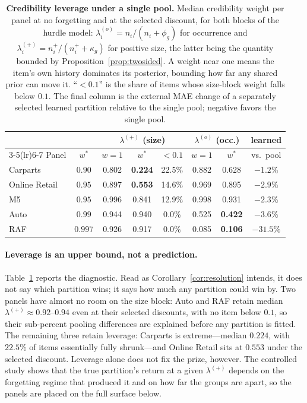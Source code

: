 \begin{table}[t]
\centering
\caption{\textbf{Credibility leverage under a single pool.} Median
credibility weight per panel at no forgetting and at the selected
discount, for both blocks of the hurdle model:
$\lambda^{(o)}_i=n_i/(n_i+\phi_g)$ for occurrence and
$\lambda^{(+)}_i=n_i^{+}/(n_i^{+}+\kappa_g)$ for positive size, the
latter being the quantity bounded by Proposition~\ref{prop:twosided}.
A weight near one means the item's own history dominates its posterior,
bounding how far any shared prior can move it. ``$<0.1$'' is the share of
items whose size-block weight falls below $0.1$. The final column is the
external MAE change of a separately selected learned partition relative to
the single pool; negative favors the single pool.}
\label{tab:leverage}
\small
\setlength{\tabcolsep}{3.0pt}
\begin{tabular}{lccccccc}
\toprule
 & & \multicolumn{3}{c}{$\lambda^{(+)}$ (size)} & \multicolumn{2}{c}{$\lambda^{(o)}$ (occ.)} & learned\\
\cmidrule(lr){3-5}\cmidrule(lr){6-7}
Panel & $w^{*}$ & $w{=}1$ & $w^{*}$ & $<0.1$ & $w{=}1$ & $w^{*}$ & vs.\ pool\\
\midrule
Carparts & $0.90$ & 0.802 & \textbf{0.224} & 22.5\% & 0.882 & 0.628 & $-1.2\%$\\
Online Retail & $0.95$ & 0.897 & \textbf{0.553} & 14.6\% & 0.969 & 0.895 & $-2.9\%$\\
M5 & $0.95$ & 0.996 & 0.841 & 12.9\% & 0.998 & 0.931 & $-2.3\%$\\
Auto & $0.99$ & 0.944 & 0.940 & 0.0\% & 0.525 & \textbf{0.422} & $-3.6\%$\\
RAF & $0.997$ & 0.926 & 0.917 & 0.0\% & 0.085 & \textbf{0.106} & $-31.5\%$\\
\bottomrule
\end{tabular}
\end{table}

\paragraph{Leverage is an upper bound, not a prediction.}
Table~\ref{tab:leverage} reports the diagnostic. Read as
Corollary~\ref{cor:resolution} intends, it does not say which partition
wins; it says how much any partition could win by. Two panels have almost
no room on the size block: Auto and RAF retain median
$\lambda^{(+)}\approx0.92$--$0.94$ even at their selected discounts, with
no item below $0.1$, so their sub-percent pooling differences are
explained before any partition is fitted. %
The remaining three retain
leverage: Carparts is extreme---median $0.224$, with $22.5\%$ of items
essentially fully shrunk---and Online Retail sits at $0.553$ under the
selected discount. Leverage alone does not fix the prize, however. The
controlled study shows that the true partition's return at a given
$\lambda^{(+)}$ depends on the forgetting regime that produced it and on
how far the groups are apart, so the panels are placed on the full
surface below.

